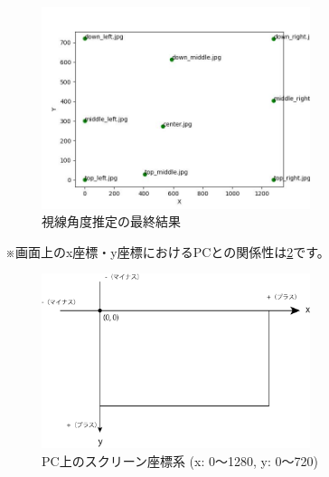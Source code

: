 \begin{figure}[!ht]
    \centering
    \includegraphics[width=0.7\textwidth]{eye-track-cursor/fig/gaze_at_result.png}
    \caption{視線角度推定の最終結果}
    \label{fig:gaze_estimation_success}
\end{figure}
※画面上のx座標・y座標におけるPCとの関係性は\ref{fig:definition_coordinates}です。
\begin{figure}[!ht]
    \centering
    \includegraphics[width=0.7\textwidth]{eye-track-cursor/fig/pc_definition.png}
    \caption{PC上のスクリーン座標系 (x: 0～1280, y: 0～720)}
    \label{fig:definition_coordinates}
\end{figure}

